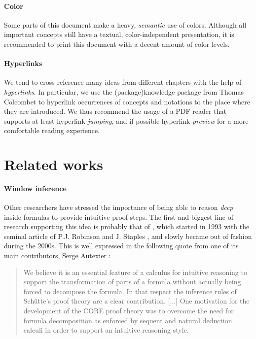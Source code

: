 \paragraph{Color}

Some parts of this document make a heavy, \emph{semantic} use of colors.
Although all important concepts still have a textual, color-independent
presentation, it is recommended to print this document with a decent amount of
color levels.

\paragraph{Hyperlinks}
  
We tend to cross-reference many ideas from different chapters with the help of
\emph{hyperlinks}. In particular, we use the \kl(package){knowledge} package
from Thomas Colcombet to hyperlink occurrences of concepts and notations to the
place where they are introduced. We thus recommend the usage of a PDF reader
that supports at least hyperlink \emph{jumping}, and if possible hyperlink
\emph{preview} for a more comfortable reading experience.


\section{Related works}

\paragraph{Window inference}

\AP
Other researchers have stressed the importance of being able to reason
\emph{deep} inside formulas to provide intuitive proof steps. The first and
biggest line of research supporting this idea is probably that of , which started in 1993 with the seminal article of P.J. Robinson and
J. Staples , and slowly became out of
fashion during the 2000s. This is well expressed in the following quote from one
of its main contributors, Serge Autexier :

\begin{quote}
We believe it is an essential feature of a calculus for intuitive reasoning to
support the transformation of parts of a formula without actually being forced
to decompose the formula. In that respect the inference rules of Schütte's proof
theory are a clear contribution. [...] One motivation for the development of the
CORE proof theory was to overcome the need for formula decomposition as enforced
by sequent and natural deduction calculi in order to support an intuitive
reasoning style.
\end{quote}

